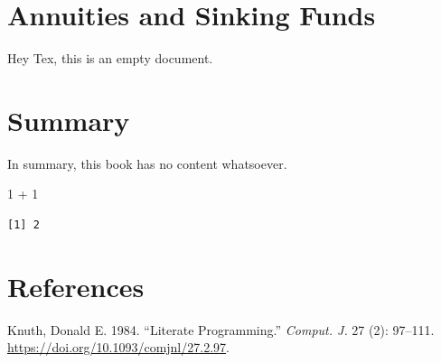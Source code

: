 \documentclass[
  letterpaper,
  DIV=11,
  numbers=noendperiod]{scrreprt}
\newenvironment{Shaded}{\begin{snugshade}}{\end{snugshade}}
\newcommand{\DecValTok}[1]{\textcolor[rgb]{0.68,0.00,0.00}{#1}}
\newcommand{\SpecialCharTok}[1]{\textcolor[rgb]{0.37,0.37,0.37}{#1}}
\newlength{\cslhangindent}
\newlength{\cslentryspacingunit} %
\newenvironment{CSLReferences}[2] %
 {%
  \setlength{\parindent}{0pt}
  \ifodd #1
  \let\oldpar\par
  \def\par{\hangindent=\cslhangindent\oldpar}
  \fi
  \setlength{\parskip}{#2\cslentryspacingunit}
 }%
 {}
\begin{document}
\hypertarget{annuities-and-sinking-funds}{%
\chapter{Annuities and Sinking
Funds}\label{annuities-and-sinking-funds}}

Hey Tex, this is an empty document.


\hypertarget{summary}{%
\chapter{Summary}\label{summary}}

In summary, this book has no content whatsoever.

\begin{Shaded}
\begin{Highlighting}[]
\DecValTok{1} \SpecialCharTok{+} \DecValTok{1}
\end{Highlighting}
\end{Shaded}

\begin{verbatim}
[1] 2
\end{verbatim}


\hypertarget{references}{%
\chapter*{References}\label{references}}


\hypertarget{refs}{}
\begin{CSLReferences}{1}{0}
\leavevmode{}%
Knuth, Donald E. 1984. {``Literate Programming.''} \emph{Comput. J.} 27
(2): 97--111. \url{https://doi.org/10.1093/comjnl/27.2.97}.

\end{CSLReferences}
\end{document}
